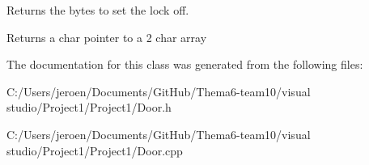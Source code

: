 Returns the bytes to set the lock off. 

\begin{DoxyReturn}{Returns}
a char pointer to a 2 char array 
\end{DoxyReturn}


The documentation for this class was generated from the following files\+:\begin{DoxyCompactItemize}
\item 
C\+:/\+Users/jeroen/\+Documents/\+Git\+Hub/\+Thema6-\/team10/visual studio/\+Project1/\+Project1/Door.\+h\item 
C\+:/\+Users/jeroen/\+Documents/\+Git\+Hub/\+Thema6-\/team10/visual studio/\+Project1/\+Project1/Door.\+cpp\end{DoxyCompactItemize}
